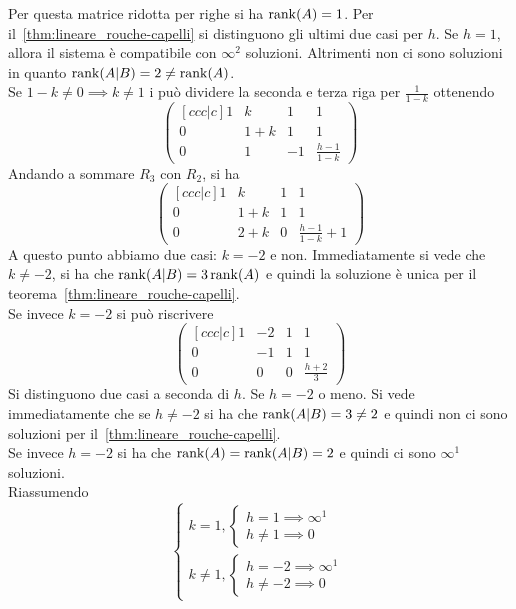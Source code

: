 Per questa matrice ridotta per righe si ha $\rank(A)=1$. Per
il~\autoref{thm:lineare_rouche-capelli} si distinguono gli ultimi due casi per $h$. Se
$h=1$, allora il sistema è compatibile con $\infty^2$ soluzioni. Altrimenti non ci sono
soluzioni in quanto $\rank(A\vert B) = 2 \neq \rank(A)$.\\
Se $1-k\neq0\implies k\neq1$ i può dividere la seconda e terza riga per $\frac{1}{1-k}$
ottenendo
\begin{equation*}
    \begin{pmatrix}[ccc|c]
    1 & k & 1 & 1\\
    0 & 1+k & 1 & 1\\
    0 & 1 & -1 & \frac{h-1}{1-k}
    \end{pmatrix}
\end{equation*}
Andando a sommare $R_3$ con $R_2$, si ha
\begin{equation*}
    \begin{pmatrix}[ccc|c]
    1 & k & 1 & 1\\
    0 & 1+k & 1 & 1\\
    0 & 2+k & 0 & \frac{h-1}{1-k}+1
    \end{pmatrix}
\end{equation*}
A questo punto abbiamo due casi: $k=-2$ e non. Immediatamente si vede che $k\neq-2$, si
ha che $\rank(A\vert B) = 3 \rank(A)$ e quindi la soluzione è unica per il
teorema~\autoref{thm:lineare_rouche-capelli}.\\
Se invece $k=-2$ si può riscrivere
\begin{equation*}
    \begin{pmatrix}[ccc|c]
      1 & -2 & 1 & 1\\
      0 & -1 & 1 & 1\\
      0 & 0 & 0 & \frac{h+2}{3}
    \end{pmatrix}
\end{equation*}
Si distinguono due casi a seconda di $h$. Se $h=-2$ o meno. Si vede immediatamente che
se $h\neq-2$ si ha che $\rank(A\vert B)=3\neq2$ e quindi non ci sono soluzioni per
il~\autoref{thm:lineare_rouche-capelli}.\\
Se invece $h=-2$ si ha che $\rank(A) = \rank(A\vert B) = 2$ e quindi ci sono $\infty^1$
soluzioni.\\
Riassumendo
\begin{equation*}
  \begin{cases}
    k=1,
    \begin{cases}
      h=1\implies\infty^1\\
      h\neq 1\implies 0
    \end{cases}\\
    k\neq1,
    \begin{cases}
      h=-2\implies\infty^1\\
      h\neq-2\implies 0
    \end{cases}
  \end{cases}
\end{equation*}
